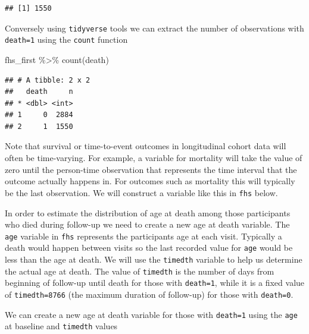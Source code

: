 \documentclass[
]{book}
\newenvironment{Shaded}{\begin{snugshade}}{\end{snugshade}}
\newcommand{\FunctionTok}[1]{\textcolor[rgb]{0.00,0.00,0.00}{#1}}
\newcommand{\NormalTok}[1]{#1}
\newcommand{\SpecialCharTok}[1]{\textcolor[rgb]{0.00,0.00,0.00}{#1}}
\begin{document}
\begin{Shaded}
\end{Shaded}

\begin{verbatim}
## [1] 1550
\end{verbatim}

Conversely using \texttt{tidyverse} tools we can extract the number of observations with \texttt{death=1} using the \texttt{count} function

\begin{Shaded}
\begin{Highlighting}[]
\NormalTok{fhs\_first }\SpecialCharTok{\%\textgreater{}\%} 
\FunctionTok{count}\NormalTok{(death) }
\end{Highlighting}
\end{Shaded}

\begin{verbatim}
## # A tibble: 2 x 2
##   death     n
## * <dbl> <int>
## 1     0  2884
## 2     1  1550
\end{verbatim}

Note that survival or time-to-event outcomes in longitudinal cohort data will often be time-varying. For example, a variable for mortality will take the value of zero until the person-time observation that represents the time interval that the outcome actually happens in. For outcomes such as mortality this will typically be the last observation. We will construct a variable like this in \texttt{fhs} below.

In order to estimate the distribution of age at death among those participants who died during follow-up we need to create a new age at death variable. The \texttt{age} variable in \texttt{fhs} represents the participants age at each visit. Typically a death would happen between visits so the last recorded value for \texttt{age} would be less than the age at death. We will use the \texttt{timedth} variable to help us determine the actual age at death. The value of \texttt{timedth} is the number of days from beginning of follow-up until death for those with \texttt{death=1}, while it is a fixed value of \texttt{timedth=8766} (the maximum duration of follow-up) for those with \texttt{death=0}.

We can create a new age at death variable for those with \texttt{death=1} using the \texttt{age} at baseline and \texttt{timedth} values
\end{document}
